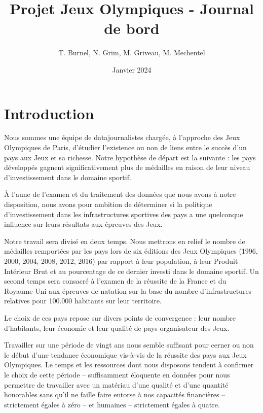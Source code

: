 \documentclass[hidelinks, 12pt]{report}
\title{Projet Jeux Olympiques - Journal de bord}
\date{Janvier 2024}
\author{T. Burnel, N. Grim, M. Griveau, M. Mechentel}
\begin{document}
\maketitle





%





\tableofcontents

\chapter{Introduction}

Nous sommes une équipe de datajournalistes chargée, à l'approche des Jeux Olympiques de Paris, d'étudier l'existence ou non de liens entre le succès d'un pays aux Jeux et sa richesse. Notre hypothèse de départ est la suivante : les pays développés gagnent significativement plus de médailles en raison de leur niveau d'investissement dans le domaine sportif. 

À l'aune de l'examen et du traitement des données que nous avons à notre disposition, nous avons pour ambition de déterminer si la politique d'investissement dans les infrastructures sportives des pays a une quelconque influence sur leurs résultats aux épreuves des Jeux.

Notre travail sera divisé en deux temps. Nous mettrons en relief le nombre de médailles remportées par les pays lors de six éditions des Jeux Olympiques (1996, 2000, 2004, 2008, 2012, 2016) par rapport à leur population, à leur Produit Intérieur Brut et au pourcentage de ce dernier investi dans le domaine sportif. Un second temps sera consacré à l'examen de la réussite de la France et du Royaume-Uni aux épreuves de natation sur la base du nombre d'infrastructures relatives pour 100.000 habitants sur leur territoire.

Le choix de ces pays repose sur divers points de convergence : leur nombre d'habitants, leur économie et leur qualité de pays organisateur des Jeux. 

Travailler sur une période de vingt ans nous semble suffisant pour cerner ou non le début d'une tendance économique vis-à-vis de la réussite des pays aux Jeux Olympiques. Le temps et les ressources dont nous disposons tendent à confirmer le choix de cette période -- suffisamment éloquente en données pour nous permettre de travailler avec un matériau d'une qualité et d'une quantité honorables sans qu'il ne faille faire entorse à nos capacités financières -- strictement égales à zéro -- et humaines -- strictement égales à quatre.
\end{document}
